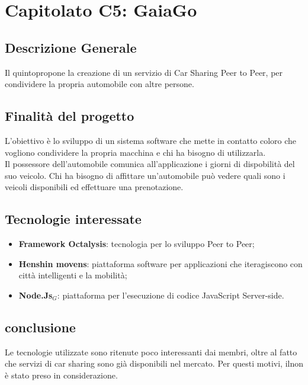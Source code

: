 \chapter{Capitolato C5: GaiaGo}
\section{Descrizione Generale}

Il quintopropone la creazione di un servizio di Car Sharing Peer to Peer, per condividere la propria automobile con altre persone.


\section{Finalit\`a del progetto}
L'obiettivo è lo sviluppo di un sistema software che mette in contatto coloro che vogliono condividere la propria macchina e chi ha bisogno di utilizzarla.\\
Il possessore dell'automobile comunica all'applicazione i giorni di dispobilit\`a del suo veicolo.
Chi ha bisogno di affittare un'automobile può vedere quali sono i veicoli disponibili ed effettuare una prenotazione.

\section{Tecnologie interessate}
\begin{itemize}
\item \textbf{Framework Octalysis}: tecnologia per lo sviluppo Peer to Peer;
\item \textbf{Henshin movens}: piattaforma software per applicazioni che iteragiscono con città intelligenti e la mobilità;
\item \textbf{Node.Js$_{G}$}: piattaforma per l'esecuzione di codice JavaScript Server-side.
\end{itemize}
\section{conclusione}
Le tecnologie utilizzate sono ritenute poco interessanti dai membri, oltre al fatto che servizi di car sharing sono già disponibili nel mercato. Per questi motivi, ilnon è stato preso in considerazione. 